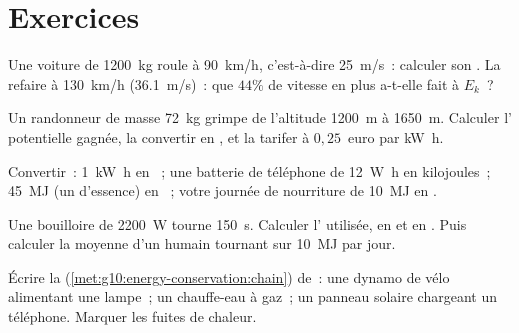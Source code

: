 \section{Exercices}

\begin{exercise}[$\star$]\label{exo:g10:energy-conservation:1}
Une voiture de \qty{1200}{kg} roule à \qty{90}{km/h}, c'est-à-dire
\qty{25}{m/s}~: calculer son . La
refaire à \qty{130}{km/h} (\qty{36.1}{m/s})~: que $44\%$ de vitesse en
plus a-t-elle fait à $E_k$~?
\end{exercise}

\begin{exercise}[$\star$]\label{exo:g10:energy-conservation:2}
Un randonneur de masse \qty{72}{kg} grimpe de l'altitude \qty{1200}{m}
à \qty{1650}{m}. Calculer l' potentielle gagnée,
la convertir en , et la tarifer à
$0{,}25$~euro par \unit{kW.h}.
\end{exercise}

\begin{exercise}[$\star$]\label{exo:g10:energy-conservation:3}
Convertir~: \qty{1}{kW.h} en ~; une batterie de
téléphone de \qty{12}{W.h} en kilojoules~; \qty{45}{MJ} (un
 d'essence) en
~; votre journée de nourriture de
\qty{10}{MJ} en .
\end{exercise}

\begin{exercise}[$\star$]\label{exo:g10:energy-conservation:4}
Une bouilloire de \qty{2200}{W} tourne \qty{150}{s}. Calculer
l' utilisée, en  et
en . Puis calculer la
 moyenne d'un humain tournant sur
\qty{10}{MJ} par jour.
\end{exercise}

\begin{exercise}[$\star$]\label{exo:g10:energy-conservation:5}
Écrire la 
(\cref{met:g10:energy-conservation:chain}) de~: une dynamo de vélo
alimentant une lampe~; un chauffe-eau à gaz~; un panneau solaire
chargeant un téléphone. Marquer les fuites de chaleur.
\end{exercise}

